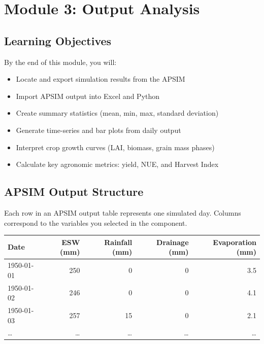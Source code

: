 
\chapter{Module 3: Output Analysis}
\label{ch:module3}

\section{Learning Objectives}

By the end of this module, you will:
\begin{itemize}
  \item Locate and export simulation results from the APSIM 
  \item Import APSIM output into Excel and Python
  \item Create summary statistics (mean, min, max, standard deviation)
  \item Generate time-series and bar plots from daily output
  \item Interpret crop growth curves (LAI, biomass, grain mass phases)
  \item Calculate key agronomic metrics: yield, NUE, and Harvest Index
\end{itemize}

\section{APSIM Output Structure}

Each row in an APSIM output table represents one simulated day. Columns correspond to the variables you selected in the  component.

\begin{center}
\begin{tabular}{l|r|r|r|r}
\textbf{Date} & \textbf{ESW (mm)} & \textbf{Rainfall (mm)} & \textbf{Drainage (mm)} & \textbf{Evaporation (mm)} \\
\hline
1950-01-01 & 250 & 0 & 0 & 3.5 \\
1950-01-02 & 246 & 0 & 0 & 4.1 \\
1950-01-03 & 257 & 15 & 0 & 2.1 \\
\ldots & \ldots & \ldots & \ldots & \ldots \\
\end{tabular}
\end{center}


